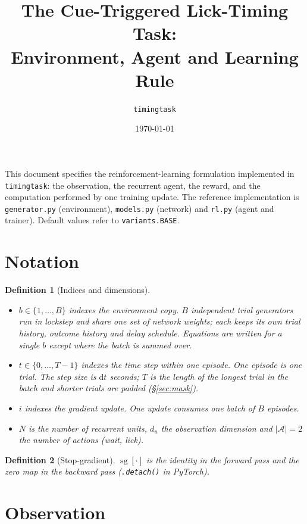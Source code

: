 \documentclass[11pt]{article}
\title{\bf The Cue-Triggered Lick-Timing Task:\\ Environment, Agent and Learning Rule}
\author{\texttt{timingtask}}
\date{\today}
\newtheorem{definition}{Definition}
\newcommand{\sg}{\operatorname{sg}}
\newcommand{\1}{\mathbf{1}}
\begin{document}
\maketitle

\noindent
This document specifies the reinforcement-learning formulation implemented in
\texttt{timingtask}: the observation, the recurrent agent, the reward, and the
computation performed by one training update. The reference implementation is
\texttt{generator.py} (environment), \texttt{models.py} (network) and \texttt{rl.py}
(agent and trainer). Default values refer to \texttt{variants.BASE}.

\tableofcontents

\section{Notation}\label{sec:notation}

\begin{definition}[Indices and dimensions]
\begin{itemize}
  \item $b \in \{1,\dots,B\}$ indexes the environment copy. $B$ independent trial
        generators run in lockstep and share one set of network weights; each keeps its
        own trial history, outcome history and delay schedule. Equations are written for a
        single $b$ except where the batch is summed over.
  \item $t \in \{0,\dots,T-1\}$ indexes the time step within one episode. One episode is
        one trial. The step size is $\mathrm{d}t$ seconds; $T$ is the length of the longest
        trial in the batch and shorter trials are padded (\S\ref{sec:mask}).
  \item $i$ indexes the gradient update. One update consumes one batch of $B$ episodes.
  \item $N$ is the number of recurrent units, $d_u$ the observation dimension and
        $|\mathcal{A}| = 2$ the number of actions (wait, lick).
\end{itemize}
\end{definition}

\begin{definition}[Stop-gradient]
$\sg[\cdot]$ is the identity in the forward pass and the zero map in the backward pass
(\texttt{.detach()} in PyTorch).
\end{definition}

\section{Observation}\label{sec:obs}
\end{document}
